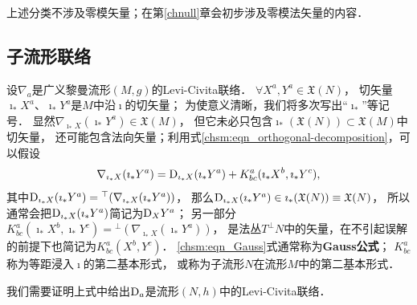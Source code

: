 上述分类不涉及零模矢量；在第\ref{chnull}章会初步涉及零模法矢量的内容．



\subsection{子流形联络}
设${\nabla}_a$是广义黎曼流形$({M},{g})$的Levi-Civita联络．
$\forall X^a, Y^a \in \mathfrak{X}(N)$，
切矢量$\imath_* X^a$、$\imath_* Y^a$是${M}$中沿$\imath$的切矢量；
为使意义清晰，我们将多次写出“$\imath_*$”等记号．
显然${\nabla}_{\imath_* X} (\imath_* Y^a) \in \mathfrak{X}({M})$，
但它未必只包含$\imath_* (\mathfrak{X}(N)) \subset \mathfrak{X}({M})$中切矢量，
还可能包含法向矢量；利用式\eqref{chsm:eqn_orthogonal-decomposition}，可以假设
\begin{equation}\label{chsm:eqn_Gauss}
    {\nabla}_{\imath_* X} (\imath_*Y^a) = {\rm D}_{\imath_*X} (\imath_*Y^a)
    + K^a_{bc}  (\imath_*X^b, \imath_*Y^c),
\end{equation}
其中${\rm D}_{\imath_*X} (\imath_*Y^a)  = {}^{\top}({\nabla}_{\imath_* X} (\imath_*Y^a))$，
那么$ {\rm D}_{\imath_*X} (\imath_*Y^a) \in \imath_* (\mathfrak{X}(N))\equiv \mathfrak{X}(N) $，
所以通常会把${\rm D}_{\imath_*X} (\imath_*Y^a) $简记为${\rm D}_{X} Y^a $；
另一部分$K^a_{bc}(\imath_*X^b,\imath_*Y^c) = {}^{\bot}({\nabla}_{\imath_* X} (\imath_*Y^a)) $，
是法丛$T^\bot N$中的矢量，在不引起误解的前提下也简记为$K^a_{bc} (X^b ,Y^c)$．
\eqref{chsm:eqn_Gauss}式通常称为{\bfseries\heiti Gauss公式}；
$K^a_{bc}$称为等距浸入$\imath$的{\heiti 第二基本形式}，
或称为子流形$N$在流形${M}$中的第二基本形式．

我们需要证明上式中给出${\rm D}_a$是流形$(N,h)$中的Levi-Civita联络．




